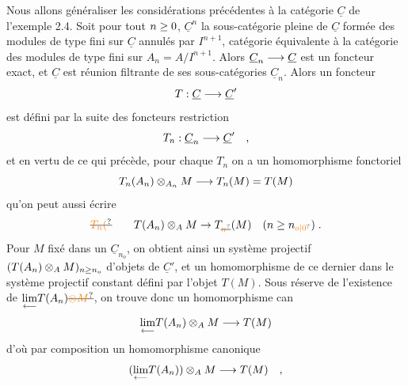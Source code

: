 Nous allons généraliser les considérations précédentes à la catégorie
$\underline C$ de l'exemple 2.4. Soit pour tout $n\geq0$, $\underline C^n$ la sous-catégorie pleine de
$\underline C$ formée des modules de type fini sur $\underline C$ annulés par $I^{n+1}$, catégorie
équivalente à la catégorie des modules de type fini sur $A_n=A/I^{n+1}$. Alors
$\underline C_n\longrightarrow\underline C$ est un foncteur exact, et $\underline C$ est réunion filtrante de ses sous-catégories $\underline C_n$. Alors un foncteur 
\[
T:\underline C\longrightarrow\underline C'
\]
est défini par la suite des foncteurs restriction
\[
T_n:\underline C_n\longrightarrow\underline C'\quad,
\]
et en vertu de ce qui précède, pour chaque $T_n$ on a un homomorphisme
fonctoriel
\[
T_n(A_n)\otimes_{A_n}M\longrightarrow T_n(M)=T(M)
\]
qu'on peut aussi écrire
\[
\deleted{\unsure{T_n(}}\qquad T(A_n)\otimes_A M\handwritten{\to}T_{\deleted{\unsure{n}}}(M)\quad\handwritten{(n\geq n_{\unsure{o|0}})}\;.
\]
Pour $M$ fixé dans un $\underline C_{n_o}$, on obtient ainsi un système projectif 
 $(T(A_n)\otimes_A M)_{n\geq n_o}$ d'objets de $\underline C'$, et un homomorphisme de ce dernier dans
le système projectif constant défini par  l'objet $T(M)$. Sous réserve
de l'existence de $\underset{\handwritten{\longleftarrow}}{\lim}T(A_n)\deleted{\unsure{\otimes M}}$, on trouve donc un homomorphisme can
\[
\underset{\longleftarrow}{\lim}T(A_n)\otimes_A M\longrightarrow T(M)
\]
d'où par composition un homomorphisme canonique
\[
(\underset{\longleftarrow}{\lim}T(A_n))\otimes_A M\longrightarrow T(M)\quad,
\]


